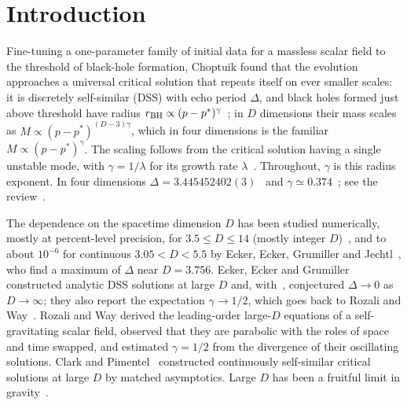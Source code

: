 \documentclass[aps,prd,onecolumn,superscriptaddress,nofootinbib,10pt]{revtex4-2}
\begin{document}
\maketitle

\section{Introduction}

Fine-tuning a one-parameter family of initial data for a massless scalar field to the threshold of black-hole
formation, Choptuik found that the evolution approaches a universal critical solution that repeats itself on ever
smaller scales: it is discretely self-similar (DSS) with echo period $\Delta$, and black holes formed just above
threshold have radius $r_{\rm BH} \propto (p - p^*)^\gamma$~\cite{Choptuik1993}; in $D$ dimensions their mass scales as
$M \propto (p - p^*)^{(D-3)\gamma}$, which in four dimensions is the familiar $M \propto (p - p^*)^\gamma$. The scaling follows from
the critical solution having a single unstable mode, with $\gamma = 1/\lambda$ for its growth rate
$\lambda$~\cite{KoikeHaraAdachi1995}. Throughout, $\gamma$ is this radius exponent. In four dimensions
$\Delta = 3.445452402(3)$~\cite{MartinGarciaGundlach2003} and $\gamma \simeq 0.374$~\cite{Gundlach1997}; see the
review~\cite{GundlachReview2025}.

The dependence on the spacetime dimension $D$ has been studied numerically, mostly at percent-level precision, for
$3.5 \le D \le 14$ (mostly integer $D$)~\cite{GarfinkleCutlerDuncan1999,SorkinOren2005,BlandEtAl2005,BlandKunstatter2007,Bland2007,TavesKunstatter2011}, and to about
$10^{-6}$ for continuous $3.05 < D < 5.5$ by Ecker, Ecker, Grumiller and Jechtl~\cite{EckerEtAl2026}, who find a
maximum of $\Delta$ near $D = 3.756$. Ecker, Ecker and Grumiller~\cite{EckerEckerGrumiller2026} constructed analytic
DSS solutions at large $D$ and, with~\cite{EckerEtAl2026}, conjectured $\Delta \to 0$ as $D \to \infty$; they also report the
expectation $\gamma \to 1/2$, which goes back to Rozali and Way~\cite{RozaliWay2018}. Rozali and Way derived the leading-order
large-$D$ equations of a self-gravitating scalar field, observed that they are parabolic with the roles of space and time
swapped, and estimated $\gamma = 1/2$ from the divergence of their oscillating solutions. Clark and
Pimentel~\cite{ClarkPimentel2025} constructed continuously self-similar critical solutions at large $D$ by matched
asymptotics. Large $D$ has been a fruitful limit in gravity~\cite{EmparanHerzog2020}.
\end{document}
